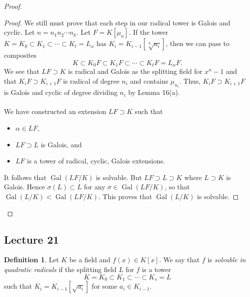 \documentclass[10pt,letterpaper,cm]{nupset}
\theoremstyle{definition}
\newtheorem*{definition}{Definition}
\newcommand{\1}{\mathbf{1}}
\newcommand{\0}{\vec 0}
\DeclareMathOperator{\gal}{Gal}
\begin{document}
\begin{proof}
\begin{proof}
We still must prove that each step in our radical tower is Galois and cyclic. Let $n=n_1n_2 \cdots n_k$.  Let $F = K[\mu_n]$. If the tower $K = K_0 \subset K_1 \subset \cdots \subset K_t = L_{\alpha}$ has $K_i = K_{i-1}[\sqrt[n_i]{a_i}]$, then we can pass to composites $$  K \subset K_0F \subset K_1F \subset \cdots \subset K_tF = L_{\alpha}F  .$$ We see that $LF \supset K$ is radical and Galois as the splitting field for $x^n-1$ and that $K_iF \supset K_{i+1}F$ is radical of degree $n_i$ and contains $\mu_{n_i}$. Thus, $K_iF \supset K_{i+1}F$ is Galois and cyclic of degree dividing $n_i$ by Lemma 16(a). 
\\ \\ We have constructed an extension $LF \supset K$ such that
\begin{itemize}
\item $\alpha \in LF$,
\item $LF \supset L$ is Galois, and
\item $LF$ is a tower of radical, cyclic, Galois extensions.
\end{itemize}
It follows that $\gal(LF/K)$ is solvable. But $LF \supset L \supset K$ where $L \supset K$ is Galois. Hence $\sigma(L) \subset L$ for any $\sigma \in \gal(LF/K)$, so that $\gal(L/K) < \gal(LF/K)$. This proves that $\gal(L/K)$ is solvable.
\end{proof}
\end{proof}

\subsection{Lecture 21}

\begin{definition}
Let $K$ be a field and $f(x) \in K[x]$. We say that $f$ is \textit{solvable in quadratic radicals} if the splitting field $L$ for $f$ is a tower $$K = K_0 \subset K_1 \subset \cdots \subset K_s =L   $$ such that $K_i =K_{i-1}[\sqrt{a_i}]$ for some $a_i \in K_{i-1}$.
\end{definition}
\end{document}
